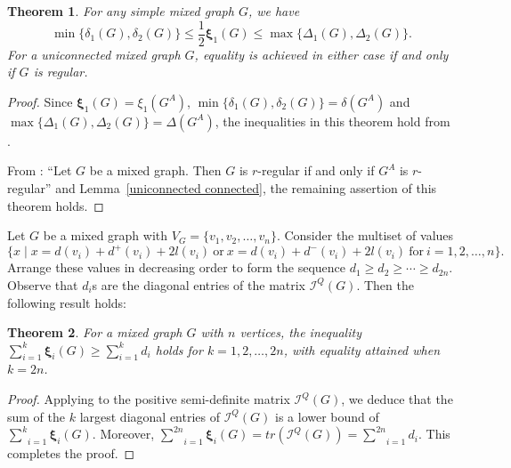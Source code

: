 \documentclass[12pt]{article}
\numberwithin{equation}{section}
\newtheorem{thm}{Theorem}[section]
\begin{document}
	\begin{thm}
		For any simple mixed graph $G$, we have $$\min\{\delta_1(G),\delta_2(G)\}\leq\frac{1}{2}\bm{\xi}_1(G)\leq\max\{\Delta_1(G),\Delta_2(G)\}.$$ 
		For a uniconnected mixed graph $ G $, equality is achieved in either case if and only if $ G $ is regular.
	\end{thm}
	\begin{proof} 
		Since $\bm{\xi}_1(G)=\xi_1(G^A)$, $\min\{\delta_1(G),\delta_2(G)\}=\delta(G^A)$ and $\max\{\Delta_1(G),\Delta_2(G)\}=\Delta(G^A)$, the inequalities in this theorem hold from \cite[Proposition~7.8.14]{cvetkovic}. 
		
		 From \cite[Lemma~6.1]{Kalaimatrices1}: ``Let $G$ be a mixed graph. Then $G$ is $r$-regular if and only if $G^A$ is $r$-regular'' and Lemma~\ref{uniconnected connected}, the remaining assertion of this theorem holds.
	\end{proof}
	
	Let $G$ be a mixed graph with $V_G=\{v_1,v_2,\ldots,v_n\}$. Consider the multiset of values $$\{x\mid x=d(v_i)+d^+(v_i)+2l(v_i) ~\text{or}~ x=d(v_i)+d^-(v_i)+2l(v_i) ~\text{for}~i=1,2,\ldots,n\}.$$ Arrange these values in decreasing order to form the sequence $d_1\geq d_2\geq \cdots\geq d_{2n}$. Observe that $d_i$s are the diagonal entries of the matrix $\mathcal{I}^Q(G)$. Then the following result holds:
	\begin{thm}
	For a mixed graph $ G $ with $ n $ vertices, the inequality $ \sum_{i=1}^{k} \bm{\xi}_i(G) \geq \sum_{i=1}^{k} d_i $ holds for $ k = 1,2, \dots, 2n $, with equality attained when $ k = 2n $.
	\end{thm}
	\begin{proof}
		 Applying   \cite[Theorem~1.3.2]{cvetkovic} to the positive semi-definite matrix $\mathcal{I}^Q(G)$, we deduce that the sum of the $k$ largest diagonal entries of $\mathcal{I}^Q(G)$ is a lower bound of $\underset{i=1}{\overset{k}{\sum}}\bm{\xi}_i(G)$. Moreover, $\underset{i=1}{\overset{2n}{\sum}}\bm{\xi}_i(G)=tr(\mathcal{I}^Q(G))=\underset{i=1}{\overset{2n}{\sum}}d_i$. This completes the proof.
	\end{proof}
	
\end{document}
